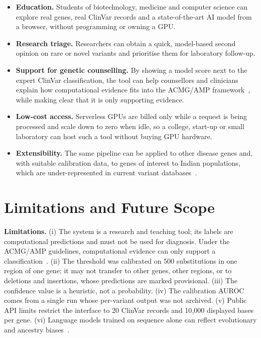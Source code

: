 \documentclass[conference,a4paper]{IEEEtran}
\begin{document}
\begin{itemize}
\item \textbf{Education.} Students of biotechnology, medicine and computer science can explore real genes, real ClinVar records and a state-of-the-art AI model from a browser, without programming or owning a GPU.
\item \textbf{Research triage.} Researchers can obtain a quick, model-based second opinion on rare or novel variants and prioritise them for laboratory follow-up.
\item \textbf{Support for genetic counselling.} By showing a model score next to the expert ClinVar classification, the tool can help counsellors and clinicians explain how computational evidence fits into the ACMG/AMP framework~\cite{richards2015acmg}, while making clear that it is only supporting evidence.
\item \textbf{Low-cost access.} Serverless GPUs are billed only while a request is being processed and scale down to zero when idle, so a college, start-up or small laboratory can host such a tool without buying GPU hardware.
\item \textbf{Extensibility.} The same pipeline can be applied to other disease genes and, with suitable calibration data, to genes of interest to Indian populations, which are under-represented in current variant databases~\cite{pathak2024ancestry}.
\end{itemize}

\section{Limitations and Future Scope}
\label{sec:limits}

\textbf{Limitations.} (i) The system is a research and teaching tool; its labels are computational predictions and must not be used for diagnosis. Under the ACMG/AMP guidelines, computational evidence can only support a classification~\cite{richards2015acmg,pejaver2022svi}. (ii) The threshold was calibrated on 500 substitutions in one region of one gene; it may not transfer to other genes, other regions, or to deletions and insertions, whose predictions are marked provisional. (iii) The confidence value is a heuristic, not a probability. (iv) The calibration AUROC comes from a single run whose per-variant output was not archived. (v) Public API limits restrict the interface to 20 ClinVar records and 10{,}000 displayed bases per gene. (vi) Language models trained on sequence alone can reflect evolutionary and ancestry biases~\cite{pugh2025likelihood,pathak2024ancestry}.
\end{document}

